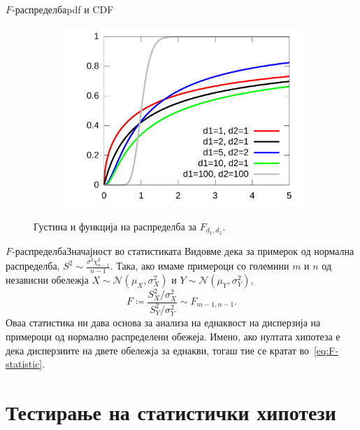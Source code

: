 \documentclass[hyperref={unicode}, xcolor={svgnames, table},
usepdftitle=false]{beamer}
\theoremstyle{remark}
\begin{document}
\begin{frame}{\(F\)-распределба}{pdf и CDF}
\begin{figure}
\begin{subfigure}[b]{.45\linewidth}
      \includegraphics[width=\textwidth]{F_CDF.pdf}
    \end{subfigure}
    \caption{Густина и функција на распределба за \(F_{d_1, d_2}\).}
  \end{figure}
\end{frame}

\begin{frame}{\(F\)-распределба}{Значајност во статистиката}
  Видовме дека за примерок од нормална распределба,
  \(S^2 \sim \frac{\sigma^2 \chi^2_{n - 1}}{n - 1}\).  Така, ако имаме примероци
  со големини \(m\) и \(n\) од независни обележја
  \(X \sim \mathcal{N}(\mu_X, \sigma_X^2)\) и
  \(Y \sim \mathcal{N}(\mu_Y, \sigma_Y^2)\),
  \begin{equation}\label{eq:F-statistic}
    F \coloneqq \frac{S_X^2 / {\sigma_X^2}}{S_Y^2 / {\sigma_Y^2}} \sim F_{m - 1,
      n - 1}\text{.}
  \end{equation}
  Оваа статистика ни дава основа за анализа на еднаквост на дисперзија на
  примероци од нормално распределени обежеја.  Имено, ако нултата хипотеза е
  дека дисперзиите на двете обележја за еднакви, тогаш тие се кратат
  во~\eqref{eq:F-statistic}.
\end{frame}

\section{Тестирање на статистички хипотези}
\end{document}
